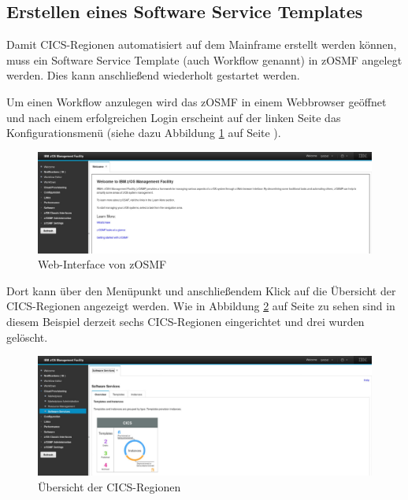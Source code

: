\subsection{Erstellen eines Software Service Templates}
Damit CICS-Regionen automatisiert auf dem Mainframe erstellt werden können, muss ein Software Service Template (auch
Workflow genannt) in zOSMF angelegt werden. Dies kann anschließend wiederholt gestartet werden.

Um einen Workflow anzulegen wird das zOSMF in einem Webbrowser geöffnet und nach einem erfolgreichen Login erscheint auf der
linken Seite das Konfigurationsmenü (siehe dazu Abbildung \ref{fig:zosmf_uebersicht} auf Seite \pageref{fig:zosmf_uebersicht}).

\begin{figure}[h]
  \centering
    \includegraphics[scale=0.32]{images/kapitel_3/zosmf_uebersicht.pdf}
  \caption{Web-Interface von zOSMF}
  \label{fig:zosmf_uebersicht}
\end{figure}

Dort kann über den Menüpunkt  und anschließendem Klick auf  die Übersicht
der CICS-Regionen angezeigt werden. Wie in Abbildung \ref{fig:zosmfsoftwareservice} auf Seite
\pageref{fig:zosmfsoftwareservice} zu sehen sind in diesem Beispiel derzeit sechs CICS-Regionen eingerichtet und drei
wurden gelöscht.

\begin{figure}[h]
  \centering
    \includegraphics[scale=0.32]{images/kapitel_3/zosmf_softwareservice.pdf}
  \caption{Übersicht der CICS-Regionen}
  \label{fig:zosmfsoftwareservice}
\end{figure}

